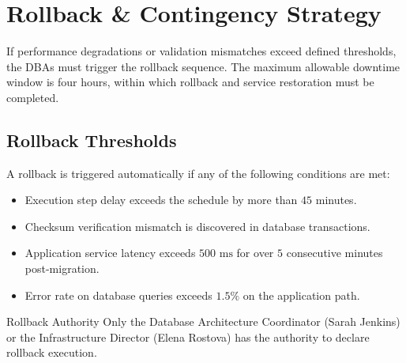 \section{Rollback \& Contingency Strategy}

If performance degradations or validation mismatches exceed defined thresholds, the DBAs must trigger the rollback sequence. The maximum allowable downtime window is four hours, within which rollback and service restoration must be completed.

\subsection{Rollback Thresholds}
A rollback is triggered automatically if any of the following conditions are met:
\begin{itemize}
    \item Execution step delay exceeds the schedule by more than $45$ minutes.
    \item Checksum verification mismatch is discovered in database transactions.
    \item Application service latency exceeds $500\text{ ms}$ for over $5$ consecutive minutes post-migration.
    \item Error rate on database queries exceeds $1.5\%$ on the application path.
\end{itemize}

\begin{infobox}{Rollback Authority}
Only the Database Architecture Coordinator (Sarah Jenkins) or the Infrastructure Director (Elena Rostova) has the authority to declare rollback execution.
\end{infobox}

